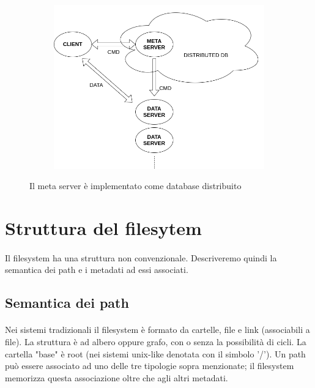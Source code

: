 \documentclass{article}
\begin{document}
\begin{figure}[H]
	\centering
	\begin{subfigure}{0.80\linewidth}
		\includegraphics[width=\linewidth]{../diagrams/architettura/7.png}
	\end{subfigure}
	\caption{Il meta server è implementato come database distribuito}
\end{figure}


\section{Struttura del filesytem}

\paragraph{} Il filesystem ha una struttura non convenzionale. Descriveremo quindi la semantica dei path e i metadati ad essi associati. 

\subsection{Semantica dei path}

\paragraph{} Nei sistemi tradizionali il filesystem è formato da cartelle, file e link (associabili a file). La struttura è ad albero oppure grafo, con o senza la possibilità di cicli. La cartella "base" è root (nei sistemi unix-like denotata con il simbolo '/'). Un path può essere associato ad uno delle tre tipologie sopra menzionate; il filesystem memorizza questa associazione oltre che agli altri metadati. 
\end{document}
